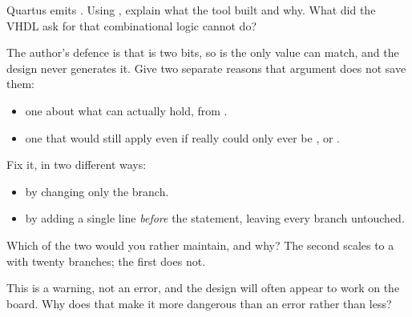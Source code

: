 \begin{parts}
  \item Quartus emits . Using ,
    explain what the tool built and why. What did the VHDL ask for that combinational logic cannot
    do?
  \item The author's defence is that  is two bits, so  is the only value
     can match, and the design never generates it. Give two separate reasons
    that argument does not save them:
    \begin{itemize}
      \item one about what  can actually hold, from .
      \item one that would still apply even if  really could only ever be ,
         or .
    \end{itemize}
  \item Fix it, in two different ways:
    \begin{itemize}
      \item by changing only the  branch.
      \item by adding a single line \emph{before} the  statement, leaving every branch
        untouched.
    \end{itemize}
    Which of the two would you rather maintain, and why? The second scales to a  with
    twenty branches; the first does not.
  \item This is a warning, not an error, and the design will often appear to work on the board. Why
    does that make it more dangerous than an error rather than less?
\end{parts}
